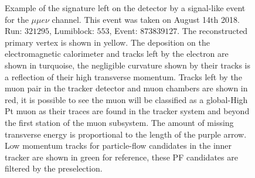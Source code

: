 \begin{figure}
  \centering
  \vfil
  \caption{Example of the signature left on the detector by a signal-like event
    for the $\mu\mu e \nu$ channel. This event was taken on August 14th 2018.
    Run: $321295$, Lumiblock: $553$, Event: $873839127$. The reconstructed primary vertex is shown in yellow.
    The deposition on the electromagnetic calorimeter and tracks left by the electron are shown in turquoise,
    the negligible curvature shown by their tracks is a reflection of their high transverse momentum.
    Tracks left by the muon pair in the tracker detector and muon chambers are shown in red, it
    is possible to see the muon will be classified as a global-High Pt muon as their traces
    are found in the tracker system and beyond the first station of the muon subsystem.
    The amount of missing
    transverse energy is proportional to the length of the purple arrow. Low momentum
    tracks for particle-flow candidates in the inner tracker are shown in green for
    reference, these PF candidates are filtered by the preselection. }
  \label{fig:Fireworks_mumuev}
\end{figure}

